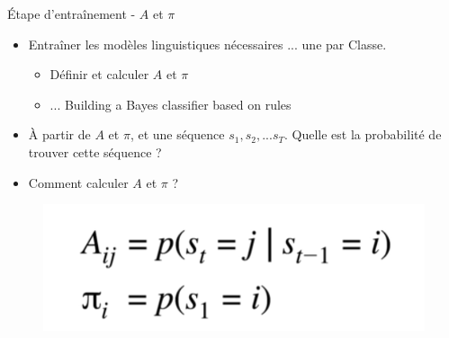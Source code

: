 \documentclass[aspectratio=169,xcolor=dvipsnames, t]{beamer}
\begin{document}
\begin{frame}{Étape d'entraînement - $A$ et $\pi$ }
	\begin{itemize}
		\item Entraîner les modèles linguistiques nécessaires ... une par Classe.
		\begin{itemize}
			\item Définir et calculer $A$ et $\pi$ 
			\item ... Building a Bayes classifier based on rules
		\end{itemize}
		\item À partir de $A$ et $\pi$, et une séquence ${s_1,s_2,...s_T}$. Quelle est la probabilité de trouver cette séquence ?
		
		\item Comment calculer $A$ et $\pi$ ?
	\end{itemize}
	
	\begin{figure}
		\includegraphics[height=0.25\paperheight]{figures/eq1AnPi.png}
	\end{figure}
	
\end{frame}
\end{document}
